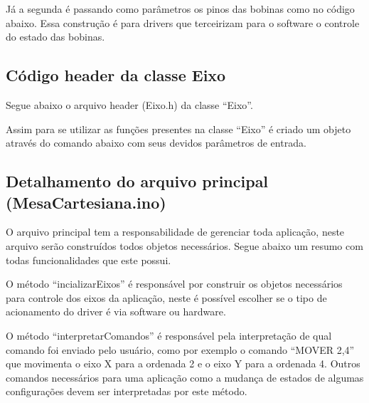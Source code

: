 {

Já a segunda é passando como parâmetros os pinos das bobinas como no código abaixo.
Essa construção é para drivers que terceirizam para o software o controle
do estado das bobinas.



\subsection{Código header da classe Eixo}\label{subsec:reseixo}

Segue abaixo o arquivo header (Eixo.h) da classe “Eixo”.



Assim para se utilizar as funções presentes na classe “Eixo” é criado um objeto 
através do comando abaixo com seus devidos parâmetros de entrada.



\subsection{Detalhamento do arquivo principal (MesaCartesiana.ino)}\label{subsec:resmesa}

O arquivo principal tem a responsabilidade de gerenciar toda aplicação, neste arquivo 
serão construídos todos objetos necessários. Segue abaixo um resumo com todas 
funcionalidades que este possui.



O método “incializarEixos” é responsável por construir os objetos necessários para controle dos 
eixos da aplicação, neste é possível escolher se o tipo de acionamento do driver 
é via software ou hardware.

O método “interpretarComandos” é responsável pela interpretação de qual comando foi enviado pelo usuário,
como por exemplo o comando “MOVER 2,4” que movimenta o eixo X para a ordenada 2 e o eixo Y para a ordenada 4.
Outros comandos necessários para uma aplicação como a mudança de estados de algumas configurações 
devem ser interpretadas por este método.

}
